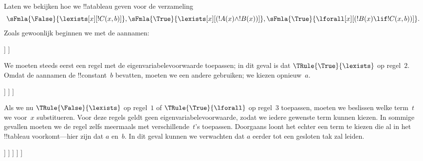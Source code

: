 \documentclass[../../../include/open-logic-section]{subfiles}
\begin{document}
\begin{ex}
Laten we bekijken hoe we !!a{tableau} geven voor de verzameling
\[
\sFmla{\False}{\lexists[x][!C(x,b)]},
\sFmla{\True}{\lexists[x][(!A(x) \land !B(x))]},
\sFmla{\True}{\lforall[x][(!B(x) \lif !C(x,b))]}.
\]
Zoals gewoonlijk beginnen we met de aannamen:
\begin{oltableau}
  [\sFmla{\False}{\lexists[x][\formula{C}(x,b)]}, just=\TAss
    [\sFmla{\True}{\lexists[x][(\formula{A}(x) \land \formula{B}(x))]},
      just=\TAss
      [\sFmla{\True}{\lforall[x][(\formula{B}(x) \lif \formula{C}(x,b))]},
        just=\TAss]
    ]
  ]
\end{oltableau}
We moeten steeds eerst een regel met de eigenvariabelevoorwaarde
toepassen; in dit geval is dat $\TRule{\True}{\lexists}$ op regel~$2$.
Omdat de aannamen de !!{constant}~$b$ bevatten, moeten we een andere
gebruiken; we kiezen opnieuw~$a$.
\begin{oltableau}
  [\sFmla{\False}{\lexists[x][\formula{C}(x,b)]}, just=\TAss
    [\sFmla{\True}{\lexists[x][(\formula{A}(x) \land \formula{B}(x))]},
      just=\TAss, checked
      [\sFmla{\True}{\lforall[x][(\formula{B}(x) \lif \formula{C}(x,b))]},
        just=\TAss
        [\sFmla{\True}{\formula{A}(a) \land \formula{B}(a)},
          just={\TRule{\True}{\lexists}[2]}]
      ]
    ]
  ]
\end{oltableau}
Als we nu $\TRule{\False}{\lexists}$ op regel~$1$ of
$\TRule{\True}{\lforall}$ op regel~$3$ toepassen, moeten we beslissen
welke term~$t$ we voor~$x$ substitueren. Voor deze regels geldt geen
eigenvariabelevoorwaarde, zodat we iedere gewenste term kunnen kiezen.
In sommige gevallen moeten we de regel zelfs meermaals met
verschillende~$t$'s toepassen. Doorgaans loont het echter een term te
kiezen die al in het !!{tableau} voorkomt---hier zijn dat $a$ en~$b$.
In dit geval kunnen we verwachten dat $a$ eerder tot een gesloten tak
zal leiden.
\begin{oltableau}
  [\sFmla{\False}{\lexists[x][\formula{C}(x,b)]}, just=\TAss
    [\sFmla{\True}{\lexists[x][(\formula{A}(x) \land \formula{B}(x))]},
      just=\TAss, checked
      [\sFmla{\True}{\lforall[x][(\formula{B}(x) \lif \formula{C}(x,b))]}, just=\TAss
        [\sFmla{\True}{\formula{A}(a) \land \formula{B}(a)}, just={\TRule{\True}{\lexists}[2]}
          [\sFmla{\False}{\formula{C}(a,b)}, just={\TRule{\False}{\lexists}[1]}
            [\sFmla{\True}{\formula{B}(a) \lif \formula{C}(a,b)},
              just={\TRule{\True}{\lforall}[3]}
            ]
          ]
        ]
      ]
    ]
  ]
\end{oltableau}

\end{ex}
\end{document}
